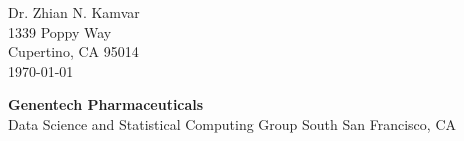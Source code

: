 


\clearpage
\begin{flushright}
  Dr. Zhian N. Kamvar\\
  1339 Poppy Way\\
  Cupertino, CA 95014\\
  \today
\end{flushright}

\textbf{Genentech Pharmaceuticals}\\
Data Science and Statistical Computing Group
South San Francisco, CA




